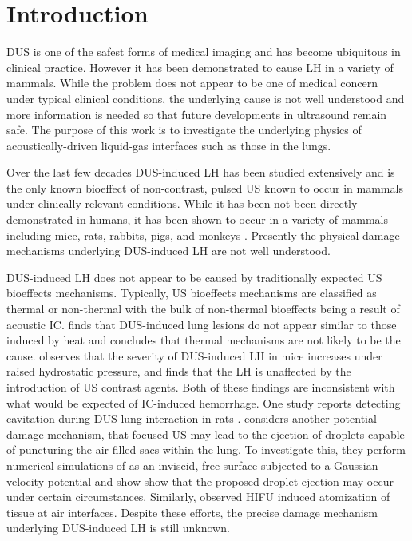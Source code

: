 \section{Introduction}%
\label{sec:introduction}%
%
\ac{DUS} is one of the safest forms of medical imaging and has become
ubiquitous in clinical practice. However it has been demonstrated to
cause \ac{LH} in a variety of mammals. While the problem does not
appear to be one of medical concern under typical clinical conditions,
the underlying cause is not well understood and more information is
needed so that future developments in ultrasound remain safe. The
purpose of this work is to investigate the underlying physics of
acoustically-driven liquid-gas interfaces such as those in the lungs.

Over the last few decades \ac{DUS}-induced \ac{LH} has been studied
extensively and is the only known bioeffect of non-contrast, pulsed
\ac{US} known to occur in mammals under clinically relevant
conditions. While it has been not been directly demonstrated in
humans, it has been shown to occur in a variety of mammals including
mice, rats, rabbits, pigs, and monkeys
\citep{Child1990,OBrien2006a,Tarantal1994a}. Presently the physical
damage mechanisms underlying \ac{DUS}-induced \ac{LH} are not well
understood.

\ac{DUS}-induced \ac{LH} does not appear to be caused by traditionally
expected \ac{US} bioeffects mechanisms. Typically, \ac{US} bioeffects
mechanisms are classified as thermal or non-thermal with the bulk of
non-thermal bioeffects being a result of acoustic
\ac{IC}. \cite{Zachary2006} finds that \ac{DUS}-induced lung lesions
do not appear similar to those induced by heat and concludes that
thermal mechanisms are not likely to be the cause. \cite{OBrien2000}
observes that the severity of \ac{DUS}-induced \ac{LH} in mice
increases under raised hydrostatic pressure, and \cite{Raeman1996}
finds that the \ac{LH} is unaffected by the introduction of \ac{US}
contrast agents. Both of these findings are inconsistent with what
would be expected of \ac{IC}-induced hemorrhage. One study reports
detecting cavitation during \ac{DUS}-lung interaction in rats
\cite{Holland1996}. \cite{Tjan2007} considers another potential damage
mechanism, that focused \ac{US} may lead to the ejection of droplets
capable of puncturing the air-filled sacs within the lung. To
investigate this, they perform numerical simulations of as an
inviscid, free surface subjected to a Gaussian velocity potential and
show show that the proposed droplet ejection may occur under certain
circumstances. Similarly, \cite{Simon2012} observed \ac{HIFU} induced
atomization of tissue at air interfaces. Despite these efforts, the
precise damage mechanism underlying \ac{DUS}-induced \ac{LH} is still
unknown.

